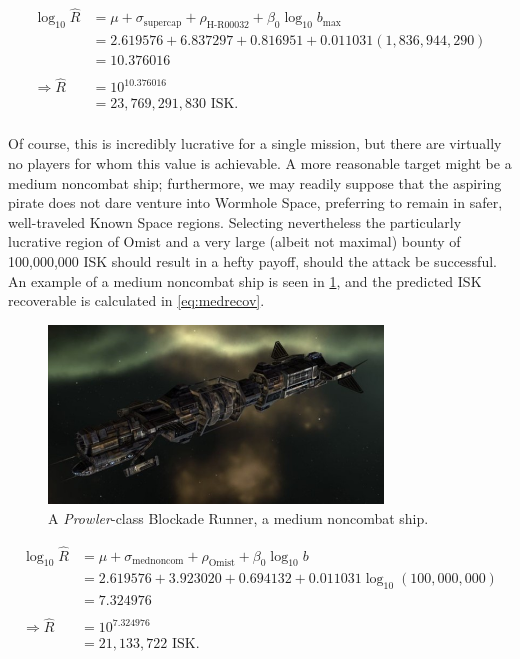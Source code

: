 \documentclass[letterpaper,12pt,article]{memoir}
\begin{document}
\begin{equation} \label{eq:titanrecov}
\begin{aligned}
    \log_{10}{\widehat{R}} &= \mu + \sigma_{\textrm{supercap}} + 
    \rho_{\textrm{H-R00032}} + \beta_0 \log_{10} b_{\textrm{max}} \\
    &= 2.619576 + 6.837297 + 0.816951 + 0.011031 (1,836,944,290) \\
    &= 10.376016 \\
    & \\
    \Rightarrow \widehat{R} &= 10^{10.376016} \\
    &= 23,769,291,830 \textrm{ ISK}. \\
\end{aligned}
\end{equation}

Of course, this is incredibly lucrative for a single mission, but there are
virtually no players for whom this value is achievable. A more reasonable target
might be a medium noncombat ship; furthermore, we may readily suppose that the
aspiring pirate does not dare venture into Wormhole Space, preferring to remain
in safer, well-traveled Known Space regions. Selecting nevertheless the 
particularly lucrative region of Omist and a very large (albeit not maximal) 
bounty of 100,000,000 ISK should result in a hefty payoff, should the attack be
successful. An example of a medium noncombat ship is seen in \cref{fig:prowler}, 
and the predicted ISK recoverable is calculated in \cref{eq:medrecov}.

\begin{figure}[ht]
    \centering
    \includegraphics[width=3.5in]{prowlerBlockadeRunner.jpg}
    \caption{A \textit{Prowler}-class Blockade Runner, a medium noncombat ship.
    \cite{prowler}}
    \label{fig:prowler}
\end{figure}

\begin{equation} \label{eq:medrecov}
\begin{aligned}
    \log_{10}{\widehat{R}} &= \mu + \sigma_{\textrm{mednoncom}} + 
    \rho_{\textrm{Omist}} + \beta_0 \log_{10} b \\
    &= 2.619576 + 3.923020 + 0.694132 + 0.011031 \log_{10}(100,000,000) \\
    &= 7.324976 \\
    & \\
    \Rightarrow \widehat{R} &= 10^{7.324976} \\
    &= 21,133,722 \textrm{ ISK}.
\end{aligned}
\end{equation}
\end{document}
